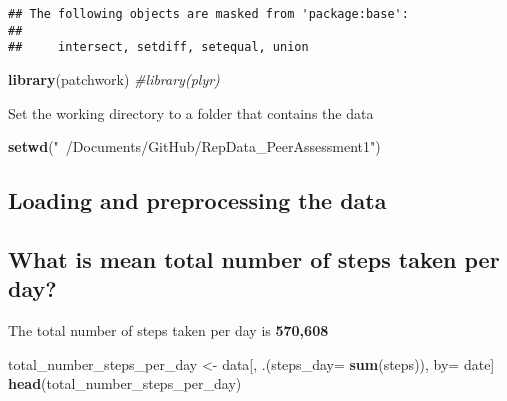 \documentclass[]{article}
\newenvironment{Shaded}{\begin{snugshade}}{\end{snugshade}}
\newcommand{\CommentTok}[1]{\textcolor[rgb]{0.56,0.35,0.01}{\textit{#1}}}
\newcommand{\DataTypeTok}[1]{\textcolor[rgb]{0.13,0.29,0.53}{#1}}
\newcommand{\KeywordTok}[1]{\textcolor[rgb]{0.13,0.29,0.53}{\textbf{#1}}}
\newcommand{\NormalTok}[1]{#1}
\newcommand{\StringTok}[1]{\textcolor[rgb]{0.31,0.60,0.02}{#1}}
\begin{document}
\begin{verbatim}
## The following objects are masked from 'package:base':
## 
##     intersect, setdiff, setequal, union
\end{verbatim}

\begin{Shaded}
\begin{Highlighting}[]
\KeywordTok{library}\NormalTok{(patchwork)}
\CommentTok{#library(plyr)}
\end{Highlighting}
\end{Shaded}

Set the working directory to a folder that contains the data

\begin{Shaded}
\begin{Highlighting}[]
\KeywordTok{setwd}\NormalTok{(}\StringTok{"~/Documents/GitHub/RepData_PeerAssessment1"}\NormalTok{)}
\end{Highlighting}
\end{Shaded}

\hypertarget{loading-and-preprocessing-the-data}{%
\subsection{Loading and preprocessing the
data}\label{loading-and-preprocessing-the-data}}

\begin{Shaded}
\end{Shaded}

\hypertarget{what-is-mean-total-number-of-steps-taken-per-day}{%
\subsection{What is mean total number of steps taken per
day?}\label{what-is-mean-total-number-of-steps-taken-per-day}}

The total number of steps taken per day is \textbf{570,608}

\begin{Shaded}
\begin{Highlighting}[]
\NormalTok{total_number_steps_per_day <-}\StringTok{ }\NormalTok{data[, .(}\DataTypeTok{steps_day=} \KeywordTok{sum}\NormalTok{(steps)), by=}\StringTok{ }\NormalTok{date]}
\KeywordTok{head}\NormalTok{(total_number_steps_per_day)}
\end{Highlighting}
\end{Shaded}
\end{document}
